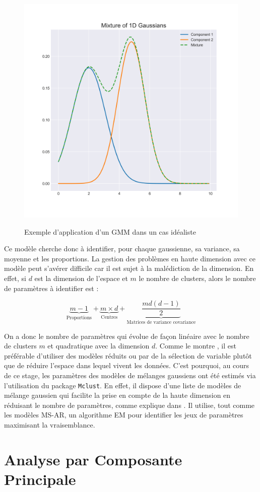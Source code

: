 \documentclass[12pt]{report}
\begin{document}
\begin{figure}[ht]
\centering
\includegraphics[width=0.5\linewidth]{Images/Models/GMM/GMM_toyexemple}
\label{fig:fig:GMM_ToyEx}
\caption{Exemple d'application d'un GMM dans un cas idéaliste }
\end{figure}

Ce modèle cherche donc à identifier, pour chaque gaussienne, sa variance, sa moyenne et les proportions. La gestion des problèmes en haute dimension avec ce modèle peut s'avérer difficile car il est sujet à la malédiction de la dimension. En effet, si $d$ est la dimension de l'espace et $m$ le nombre de clusters, alors le nombre de paramètres à identifier est :

\begin{equation}
	\underbrace{m-1}_\text{Proportions}  + \underbrace{m \times d}_\text{Centres}  +  \underbrace{\frac{md \left(d - 1\right)}{2}}_\text{Matrices de variance covariance}
	\label{eq:Model_GMM_ParamNumber} 
\end{equation}

On a donc le nombre de paramètres qui évolue de façon linéaire avec le nombre de clusters $m$ et quadratique avec la dimension $d$. Comme le montre \cite{bouveyron_model-based_2014}, il est préférable d'utiliser des modèles réduits ou par de la sélection de variable plutôt que de réduire l'espace dans lequel vivent les données. C'est pourquoi, au cours de ce stage, les paramètres des modèles de mélanges gaussiens ont été estimés via l'utilisation du package \texttt{Mclust}. En effet, il dispose d'une liste de modèles de mélange gaussien qui facilite la prise en compte de la haute dimension en réduisant le nombre de paramètres, comme explique dans \cite{scrucca_mclust_2016}. Il utilise, tout comme les modèles MS-AR, un algorithme EM pour identifier les jeux de paramètres maximisant la vraisemblance. 


\section{Analyse par Composante Principale}
\label{sec:Model_ACP}
\end{document}
